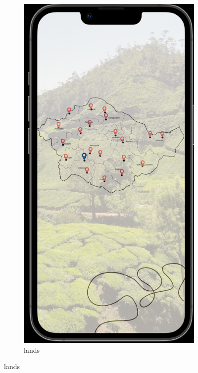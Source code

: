 \begin{figure}[ht]
\begin{subfigure}[b]{0.6\linewidth}
    \centering
    \includegraphics[width=0.82\linewidth]{figures/mapdetail.png} 
    \caption{lands} 
    \label{fig:b} 
    \vspace{4ex}
  \end{subfigure} 
  
  \label{fig:example_many_images} 
\end{figure}
\clearpage

